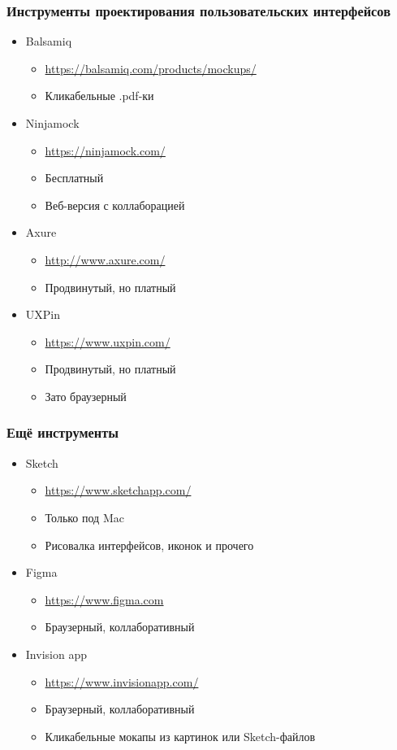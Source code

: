 \documentclass[xetex,mathserif,serif]{beamer}
\begin{document}
	\begin{frame}
		\frametitle{Инструменты проектирования пользовательских интерфейсов}
		\begin{itemize}
			\item Balsamiq
			\begin{itemize}
				\item \url{https://balsamiq.com/products/mockups/}
				\item Кликабельные .pdf-ки
			\end{itemize}
			\item Ninjamock
			\begin{itemize}
				\item \url{https://ninjamock.com/}
				\item Бесплатный
				\item Веб-версия с коллаборацией
			\end{itemize}
			\item Axure
			\begin{itemize}
				\item \url{http://www.axure.com/}
				\item Продвинутый, но платный
			\end{itemize}
			\item UXPin
			\begin{itemize}
				\item \url{https://www.uxpin.com/}
				\item Продвинутый, но платный
				\item Зато браузерный
			\end{itemize}
		\end{itemize}
	\end{frame}

	\begin{frame}
		\frametitle{Ещё инструменты}
		\begin{itemize}
			\item Sketch
			\begin{itemize}
				\item \url{https://www.sketchapp.com/}
				\item Только под Mac
				\item Рисовалка интерфейсов, иконок и прочего
			\end{itemize}
			\item Figma
			\begin{itemize}
				\item \url{https://www.figma.com}
				\item Браузерный, коллаборативный
			\end{itemize}
			\item Invision app
			\begin{itemize}
				\item \url{https://www.invisionapp.com/}
				\item Браузерный, коллаборативный
				\item Кликабельные мокапы из картинок или Sketch-файлов
			\end{itemize}
		\end{itemize}
	\end{frame}
\end{document}
